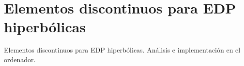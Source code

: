 \section{Elementos discontinuos para EDP hiperbólicas}

\begin{contenidos}
Elementos discontinuos para EDP hiperbólicas. Análisis e implementación en el ordenador.
\end{contenidos}



